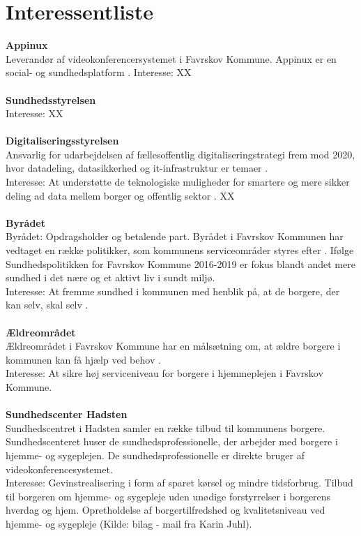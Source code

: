 \section{Interessentliste}
\textbf{Appinux}\\
 Leverandør af videokonferencersystemet i Favrskov Kommune. Appinux er en social- og sundhedsplatform \cite{appinuxwebsite}.
Interesse: XX\\ \\
\textbf{Sundhedsstyrelsen}\\
Interesse: XX\\ \\
\textbf{Digitaliseringsstyrelsen}\\
Ansvarlig for udarbejdelsen af fællesoffentlig digitaliseringstrategi frem mod 2020, hvor datadeling, datasikkerhed og it-infrastruktur er temaer \cite{digst1}.\\
Interesse: At understøtte de teknologiske muligheder for smartere og mere sikker deling ad data mellem borger og offentlig sektor \cite{digst2}. XX\\ \\
\textbf{Byrådet}\\
Byrådet: Opdragsholder og betalende part. Byrådet i Favrskov Kommunen har vedtaget en række politikker, som kommunens serviceområder styres efter \cite{favrskovkommune}. Ifølge Sundhedspolitikken for Favrskov Kommune 2016-2019 er fokus blandt andet mere sundhed i det nære og et aktivt liv i sundt miljø.\\
Interesse: At fremme sundhed i kommunen med henblik på, at de borgere, der kan selv, skal selv \cite{favrskovkommune2}.\\ \\
\textbf{Ældreområdet}\\
Ældreområdet i Favrskov Kommune har en målsætning om, at ældre borgere i kommunen kan få hjælp ved behov \cite{favrskovkommune3}.\\
Interesse: At sikre høj serviceniveau for borgere i hjemmeplejen i Favrskov Kommune. \\ \\
\textbf{Sundhedscenter Hadsten}\\
Sundhedscentret i Hadsten samler en række tilbud til kommunens borgere. Sundhedscenteret huser de sundhedsprofessionelle, der arbejder med borgere i hjemme- og sygeplejen. De sundhedsprofessionelle er direkte bruger af videokonferencesystemet.\\
Interesse: Gevinstrealisering i form af sparet kørsel og mindre tidsforbrug. Tilbud til borgeren om hjemme- og sygepleje uden unødige forstyrrelser i borgerens hverdag og hjem. Opretholdelse af borgertilfredshed og kvalitetsniveau ved hjemme- og sygepleje (Kilde: bilag - mail fra Karin Juhl).\\ \\
